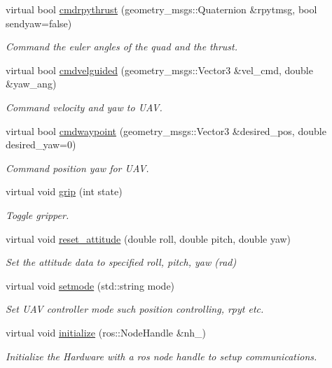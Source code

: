 \begin{DoxyCompactItemize}
virtual bool \hyperlink{classSampleParser_a95c4ea3034bcd431660f5ee2acc13e3c}{cmdrpythrust} (geometry\-\_\-msgs\-::\-Quaternion \&rpytmsg, bool sendyaw=false)
\begin{DoxyCompactList}\small\item\em Command the euler angles of the quad and the thrust. \end{DoxyCompactList}\item 
virtual bool \hyperlink{classSampleParser_a52ea7095057fa73ae1665a8dd6ccd0d0}{cmdvelguided} (geometry\-\_\-msgs\-::\-Vector3 \&vel\-\_\-cmd, double \&yaw\-\_\-ang)
\begin{DoxyCompactList}\small\item\em Command velocity and yaw to U\-A\-V. \end{DoxyCompactList}\item 
virtual bool \hyperlink{classSampleParser_a790a0041665973477028493cf51b8059}{cmdwaypoint} (geometry\-\_\-msgs\-::\-Vector3 \&desired\-\_\-pos, double desired\-\_\-yaw=0)
\begin{DoxyCompactList}\small\item\em Command position yaw for U\-A\-V. \end{DoxyCompactList}\item 
virtual void \hyperlink{classSampleParser_a20f989659a8d7d65574d37460a1e9f47}{grip} (int state)
\begin{DoxyCompactList}\small\item\em Toggle gripper. \end{DoxyCompactList}\item 
virtual void \hyperlink{classSampleParser_ab062fe44a82f5490e5c92e8512ede9a2}{reset\-\_\-attitude} (double roll, double pitch, double yaw)
\begin{DoxyCompactList}\small\item\em Set the attitude data to specified roll, pitch, yaw (rad) \end{DoxyCompactList}\item 
virtual void \hyperlink{classSampleParser_a955965dff0214bbb8e720cab858f1078}{setmode} (std\-::string mode)
\begin{DoxyCompactList}\small\item\em Set U\-A\-V controller mode such position controlling, rpyt etc. \end{DoxyCompactList}\item 
virtual void \hyperlink{classSampleParser_acaf99fced8fc57433781e766dcb931cf}{initialize} (ros\-::\-Node\-Handle \&nh\-\_\-)
\begin{DoxyCompactList}\small\item\em Initialize the Hardware with a ros node handle to setup communications. \end{DoxyCompactList}\item 

\end{DoxyCompactItemize}
